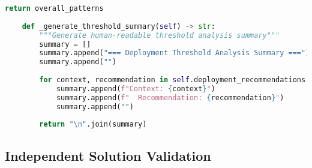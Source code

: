 \begin{lstlisting}[language=Python, caption=Cost-Benefit Threshold Analysis for Deployment Guidance]
        return overall_patterns
    
    def _generate_threshold_summary(self) -> str:
        """Generate human-readable threshold analysis summary"""
        summary = []
        summary.append("=== Deployment Threshold Analysis Summary ===")
        summary.append("")
        
        for context, recommendation in self.deployment_recommendations.items():
            summary.append(f"Context: {context}")
            summary.append(f"  Recommendation: {recommendation}")
            summary.append("")
        
        return "\n".join(summary)
\end{lstlisting}

\subsection{Independent Solution Validation}
\label{appendix:independent-validation}


